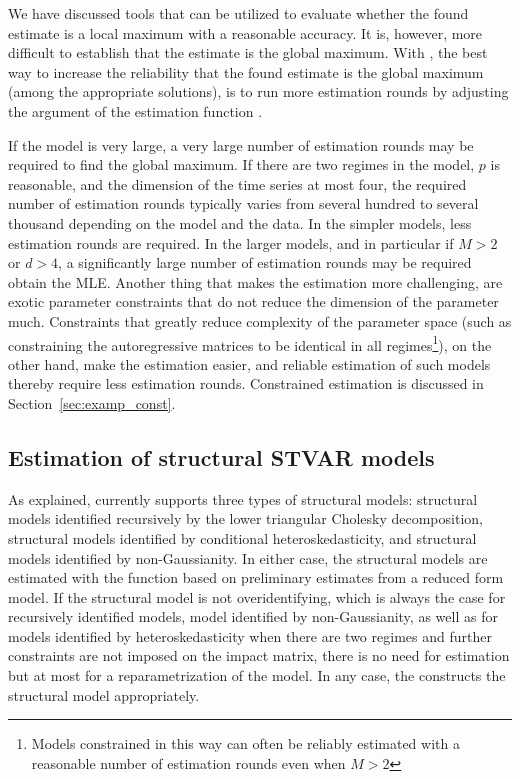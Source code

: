 \documentclass[nojss]{jss}
\begin{document}
We have discussed tools that can be utilized to evaluate whether the found estimate is a local maximum with a reasonable accuracy. It is, however, more difficult to establish that the estimate is the global maximum. With , the best way to increase the reliability that the found estimate is the global maximum (among the appropriate solutions), is to run more estimation rounds by adjusting the argument  of the estimation function .

If the model is very large, a very large number of estimation rounds may be required to find the global maximum. If there are two regimes in the model, $p$ is reasonable, and the dimension of the time series at most four, the required number of estimation rounds typically varies from several hundred to several thousand depending on the model and the data. In the simpler models, less estimation rounds are required. In the larger models, and in particular if $M>2$ or $d>4$, a significantly large number of estimation rounds may be required obtain the MLE. Another thing that makes the estimation more challenging, are exotic parameter constraints that do not reduce the dimension of the parameter much. Constraints that greatly reduce complexity of the parameter space (such as constraining the autoregressive matrices to be identical in all regimes\footnote{Models constrained in this way can often be reliably estimated with a reasonable number of estimation rounds even when $M>2$}), on the other hand, make the estimation easier, and reliable estimation of such models thereby require less estimation rounds. Constrained estimation is discussed in Section~\ref{sec:examp_const}.

\subsection{Estimation of structural STVAR models}\label{sec:estim_structural}

As explained,  currently supports three types of structural models: structural models identified recursively by the lower triangular Cholesky decomposition, structural models identified by conditional heteroskedasticity, and structural models identified by non-Gaussianity. In either case, the structural models are estimated with the function  based on preliminary estimates from a reduced form model. If the structural model is not overidentifying, which is always the case for recursively identified models, model identified by non-Gaussianity, as well as for models identified by heteroskedasticity when there are two regimes and further constraints are not imposed on the impact matrix, there is no need for estimation but at most for a reparametrization of the model. In any case, the  constructs the structural model appropriately.
\end{document}
